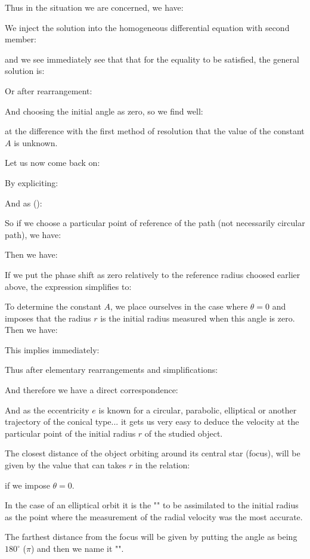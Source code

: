 	Thus in the situation we are concerned, we have:
	
	We inject the solution into the homogeneous differential equation with second member:
	
	and we see immediately see that that for the equality to be satisfied, the general solution is:
	
	Or after rearrangement:
	
	And choosing the initial angle as zero, so we find well:
	
	at the difference with the first method of resolution that the value of the constant $A$ is unknown.
	
	Let us now come back on:
	
	By expliciting:
	
	And as ():
	
	So if we choose a particular point of reference of the path (not necessarily circular path), we have:
	
	Then we have:
	
	If we put the phase shift as zero relatively to the reference radius choosed earlier above, the expression simplifies to:
	
	To determine the constant $A$, we place ourselves in the case where $\theta=0$ and imposes that the radius $r$ is the initial radius measured when this angle is zero. Then we have:
	
	This implies immediately:
	
	Thus after elementary rearrangements and simplifications:
	
	And therefore we have a direct correspondence:
	
	And as the eccentricity $e$ is known for a circular, parabolic, elliptical or another trajectory of the conical type... it gets us very easy to deduce the velocity at the particular point of the initial radius $r$ of the studied object.

	The closest distance of the object orbiting around its central star (focus), will be given by the value that can takes $r$ in the relation:
	
	if we impose $\theta=0$.

	In the case of an elliptical orbit it is the "" to be assimilated to the initial radius as the point where the measurement of the radial velocity was the most accurate.

	The farthest distance from the focus will be given by putting the angle as being $180^\circ$ ($\pi$) and then we name it "".
	

